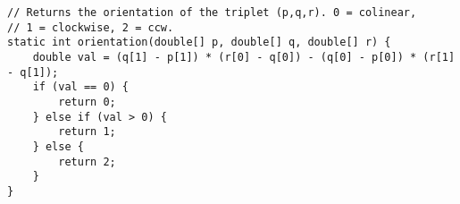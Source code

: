 \begin{verbatim}
// Returns the orientation of the triplet (p,q,r). 0 = colinear,
// 1 = clockwise, 2 = ccw.
static int orientation(double[] p, double[] q, double[] r) {
	double val = (q[1] - p[1]) * (r[0] - q[0]) - (q[0] - p[0]) * (r[1] - q[1]);
	if (val == 0) {
		return 0;
	} else if (val > 0) {
		return 1;
	} else {
		return 2;
	}
}
\end{verbatim}